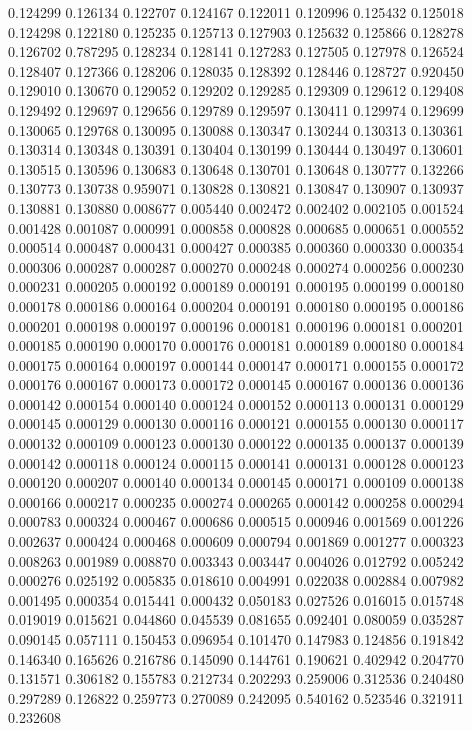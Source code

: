 0.124299
0.126134
0.122707
0.124167
0.122011
0.120996
0.125432
0.125018
0.124298
0.122180
0.125235
0.125713
0.127903
0.125632
0.125866
0.128278
0.126702
0.787295
0.128234
0.128141
0.127283
0.127505
0.127978
0.126524
0.128407
0.127366
0.128206
0.128035
0.128392
0.128446
0.128727
0.920450
0.129010
0.130670
0.129052
0.129202
0.129285
0.129309
0.129612
0.129408
0.129492
0.129697
0.129656
0.129789
0.129597
0.130411
0.129974
0.129699
0.130065
0.129768
0.130095
0.130088
0.130347
0.130244
0.130313
0.130361
0.130314
0.130348
0.130391
0.130404
0.130199
0.130444
0.130497
0.130601
0.130515
0.130596
0.130683
0.130648
0.130701
0.130648
0.130777
0.132266
0.130773
0.130738
0.959071
0.130828
0.130821
0.130847
0.130907
0.130937
0.130881
0.130880
0.008677
0.005440
0.002472
0.002402
0.002105
0.001524
0.001428
0.001087
0.000991
0.000858
0.000828
0.000685
0.000651
0.000552
0.000514
0.000487
0.000431
0.000427
0.000385
0.000360
0.000330
0.000354
0.000306
0.000287
0.000287
0.000270
0.000248
0.000274
0.000256
0.000230
0.000231
0.000205
0.000192
0.000189
0.000191
0.000195
0.000199
0.000180
0.000178
0.000186
0.000164
0.000204
0.000191
0.000180
0.000195
0.000186
0.000201
0.000198
0.000197
0.000196
0.000181
0.000196
0.000181
0.000201
0.000185
0.000190
0.000170
0.000176
0.000181
0.000189
0.000180
0.000184
0.000175
0.000164
0.000197
0.000144
0.000147
0.000171
0.000155
0.000172
0.000176
0.000167
0.000173
0.000172
0.000145
0.000167
0.000136
0.000136
0.000142
0.000154
0.000140
0.000124
0.000152
0.000113
0.000131
0.000129
0.000145
0.000129
0.000130
0.000116
0.000121
0.000155
0.000130
0.000117
0.000132
0.000109
0.000123
0.000130
0.000122
0.000135
0.000137
0.000139
0.000142
0.000118
0.000124
0.000115
0.000141
0.000131
0.000128
0.000123
0.000120
0.000207
0.000140
0.000134
0.000145
0.000171
0.000109
0.000138
0.000166
0.000217
0.000235
0.000274
0.000265
0.000142
0.000258
0.000294
0.000783
0.000324
0.000467
0.000686
0.000515
0.000946
0.001569
0.001226
0.002637
0.000424
0.000468
0.000609
0.000794
0.001869
0.001277
0.000323
0.008263
0.001989
0.008870
0.003343
0.003447
0.004026
0.012792
0.005242
0.000276
0.025192
0.005835
0.018610
0.004991
0.022038
0.002884
0.007982
0.001495
0.000354
0.015441
0.000432
0.050183
0.027526
0.016015
0.015748
0.019019
0.015621
0.044860
0.045539
0.081655
0.092401
0.080059
0.035287
0.090145
0.057111
0.150453
0.096954
0.101470
0.147983
0.124856
0.191842
0.146340
0.165626
0.216786
0.145090
0.144761
0.190621
0.402942
0.204770
0.131571
0.306182
0.155783
0.212734
0.202293
0.259006
0.312536
0.240480
0.297289
0.126822
0.259773
0.270089
0.242095
0.540162
0.523546
0.321911
0.232608
